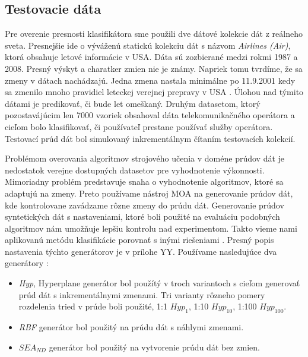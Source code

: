 \subsection{Testovacie dáta}
Pre overenie presnosti klasifikátora sme použili dve dátové kolekcie dát z reálneho sveta. Presnejšie ide o výváženú statickú kolekciu dát s názvom \textit{Airlines (Air)}, ktorá obsahuje letové informácie v USA. Dáta sú zozbierané medzi rokmi 1987 a 2008. Presný výskyt a charatker zmien nie je známy. Napriek tomu tvrdíme, že sa zmeny v dátach nachádzajú. Jedna zmena nastala minimálne po 11.9.2001 kedy sa zmenilo mnoho pravidiel leteckej verejnej prepravy v USA \citep{brzezinski2014prequential, krawczyk2015one}. Úlohou nad týmito dátami je predikovať, či bude let omeškaný. Druhým datasetom, ktorý pozostavájúcim len 7000 vzoriek obsahoval dáta telekomunikačného operátora a cieľom bolo klasifikovať, či používateľ prestane používať služby operátora. Testovací prúd dát bol simulovaný inkrementálnym čítaním testovacích kolekcií.
\par
Problémom overovania algoritmov strojového učenia v doméne prúdov dát je nedostatok verejne dostupných datasetov pre vyhodnotenie výkonnosti. Mimoriadny problém predstavuje snaha o vyhodnotenie algoritmov, ktoré sa adaptujú na zmeny. Preto používame nástroj MOA na generovanie prúdov dát, kde kontrolovane zavádzame rôzne zmeny do prúdu dát. Generovanie prúdov syntetických dát s nastaveniami, ktoré boli použité na evaluáciu podobných algoritmov nám umožňuje lepšiu kontrolu nad experimentom. Takto vieme nami aplikovanú metódu klasifikácie porovnať s inými riešeniami \citep{krawczyk2015one, brzezinski2014prequential}. Presný popis nastavenia týchto generátorov je v prílohe YY. Používame nasledujúce dva generátory \citep{bifet2010moa}:
\begin{itemize}
	\item \textit{Hyp}, Hyperplane generátor bol použítý v troch variantoch s cieľom generovať prúd dát s inkrementálnymi zmenami. Tri varianty rôzneho pomery rozdelenia tried v prúde boli použité, 1:1 $Hyp_1$, 1:10 $Hyp_10$, 1:100 $Hyp_100$.
	\item \textit{RBF} generátor bol použitý na prúdu dát s náhlymi zmenami.
	\item \textit{$SEA_{ND}$} generátor bol použitý na vytvorenie prúdu dát bez zmien.
\end{itemize}

